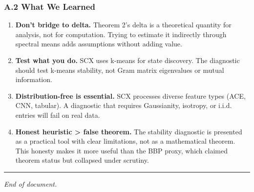 \documentclass[
  12pt,
]{ctexart}
\begin{document}
\subsubsection{A.2 What We Learned}\label{a.2-what-we-learned}

\begin{enumerate}
\def\labelenumi{\arabic{enumi}.}
\item
  \textbf{Don't bridge to delta.} Theorem 2's delta is a theoretical
  quantity for analysis, not for computation. Trying to estimate it
  indirectly through spectral means adds assumptions without adding
  value.
\item
  \textbf{Test what you do.} SCX uses k-means for state discovery. The
  diagnostic should test k-means stability, not Gram matrix eigenvalues
  or mutual information.
\item
  \textbf{Distribution-free is essential.} SCX processes diverse feature
  types (ACE, CNN, tabular). A diagnostic that requires Gaussianity,
  isotropy, or i.i.d. entries will fail on real data.
\item
  \textbf{Honest heuristic \textgreater{} false theorem.} The stability
  diagnostic is presented as a practical tool with clear limitations,
  not as a mathematical theorem. This honesty makes it more useful than
  the BBP proxy, which claimed theorem status but collapsed under
  scrutiny.
\end{enumerate}

\begin{center}\rule{0.5\linewidth}{0.5pt}\end{center}

\emph{End of document.}
\end{document}
